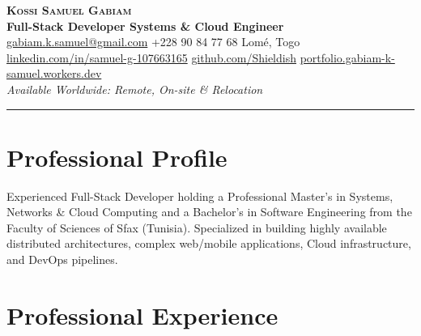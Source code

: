 \documentclass[11pt, a4paper]{article}
\begin{document}
\color{black} %

\begin{center}
  {\Huge\bfseries\scshape Kossi Samuel Gabiam}\\[6pt]
  {\large\bfseries Full-Stack Developer \textbullet{} Systems \& Cloud Engineer}\\[8pt]
  \small
  \href{mailto:gabiam.k.samuel@gmail.com}{gabiam.k.samuel@gmail.com}
  \quad\textbullet\quad
  +228 90 84 77 68
  \quad\textbullet\quad
  Lom\'{e}, Togo\\[3pt]
  \href{https://www.linkedin.com/in/samuel-g-107663165/}{linkedin.com/in/samuel-g-107663165}
  \quad\textbullet\quad
  \href{https://github.com/Shieldish}{github.com/Shieldish}
  \quad\textbullet\quad
  \href{https://portfolio.gabiam-k-samuel.workers.dev/}{portfolio.gabiam-k-samuel.workers.dev}\\[4pt]
  {\small\color{secondary}\textit{Available Worldwide: Remote, On-site \& Relocation}}
\end{center}

\vspace{-2pt}
\noindent\rule{\linewidth}{1pt}
\vspace{6pt}

\section{Professional Profile}

Experienced Full-Stack Developer holding a Professional Master's in Systems, Networks \& Cloud Computing and a Bachelor's in Software Engineering from the Faculty of Sciences of Sfax (Tunisia). Specialized in building highly available distributed architectures, complex web/mobile applications, Cloud infrastructure, and DevOps pipelines.

\section{Professional Experience}
\end{document}
